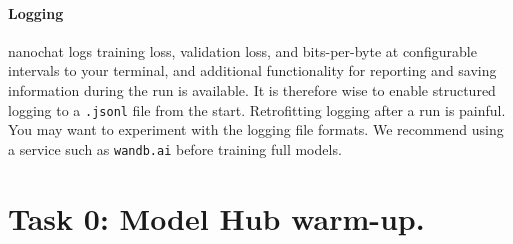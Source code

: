\paragraph{Logging}  nanochat logs training loss, validation loss, and bits-per-byte at configurable intervals to your terminal, and additional functionality for reporting and saving information during the run is available. It is therefore wise to enable structured logging to a \texttt{.jsonl} file from the start. Retrofitting logging after a run is painful. You may want to experiment with the logging file formats. We recommend using  a service such as \texttt{wandb.ai} before training full models.




\section{Task 0: Model Hub warm-up.}
